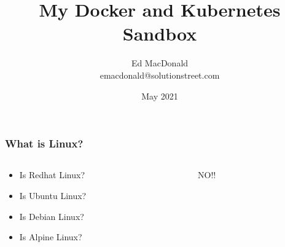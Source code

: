 
\usepackage[utf8]{inputenc}
\usepackage{minted}
\usepackage{listings}
\usepackage{graphicx}
\usepackage{xcolor}
\usepackage{adjustbox}


\hypersetup{colorlinks,linkcolor=,urlcolor=links}

\setlength{\columnseprule}{0.4pt}


\title[Kubernetes]{My Docker and Kubernetes Sandbox}
\author[Ed MacDonald]{Ed MacDonald\\emacdonald@solutionstreet.com}
\date{May 2021}




    \frame{\titlepage}

    \begin{frame}
    \frametitle{What is Linux?}
    \begin{columns}
        \begin{column}{0.5\textwidth}
            \begin{itemize}
                \item Is Redhat Linux?\pause
                \item Is Ubuntu Linux?\pause
                \item Is Debian Linux?\pause
                \item Is Alpine Linux?\pause
            \end{itemize}
        \end{column}
        \begin{column}{0.5\textwidth}
            NO!!
        \end{column}
    \end{columns}
    \end{frame}

